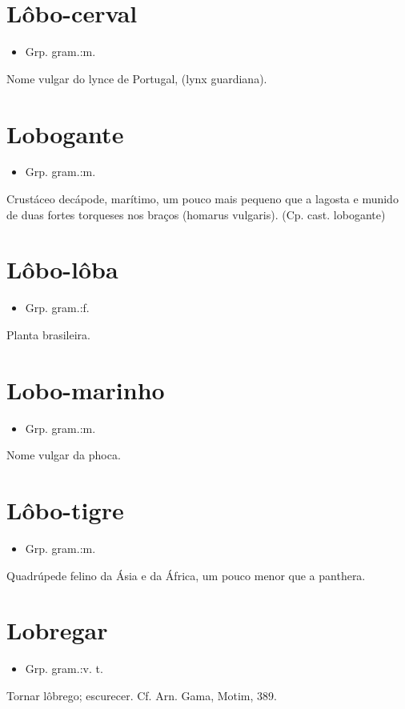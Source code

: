 \section{Lôbo-cerval}
\begin{itemize}
\item {Grp. gram.:m.}
\end{itemize}
Nome vulgar do lynce de Portugal, (\textunderscore lynx guardiana\textunderscore ).
\section{Lobogante}
\begin{itemize}
\item {Grp. gram.:m.}
\end{itemize}
Crustáceo decápode, marítimo, um pouco mais pequeno que a lagosta e munido de duas fortes torqueses nos braços (\textunderscore homarus vulgaris\textunderscore ).
(Cp. cast. \textunderscore lobogante\textunderscore )
\section{Lôbo-lôba}
\begin{itemize}
\item {Grp. gram.:f.}
\end{itemize}
Planta brasileira.
\section{Lobo-marinho}
\begin{itemize}
\item {Grp. gram.:m.}
\end{itemize}
Nome vulgar da phoca.
\section{Lôbo-tigre}
\begin{itemize}
\item {Grp. gram.:m.}
\end{itemize}
Quadrúpede felino da Ásia e da África, um pouco menor que a panthera.
\section{Lobregar}
\begin{itemize}
\item {Grp. gram.:v. t.}
\end{itemize}
Tornar lôbrego; escurecer. Cf. Arn. Gama, \textunderscore Motim\textunderscore , 389.
